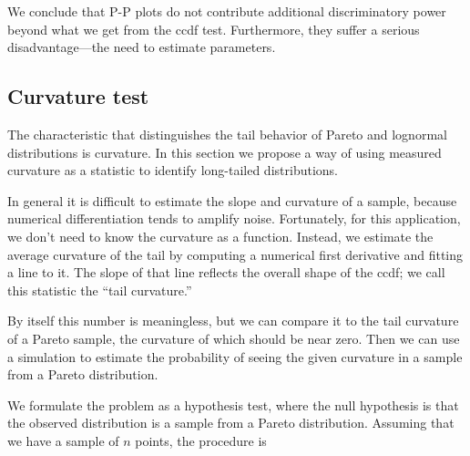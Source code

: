 \documentclass{elsart}
\begin{document}

We conclude that P-P plots do not contribute additional discriminatory
power beyond what we get from the ccdf test.  Furthermore, they
suffer a serious disadvantage---the need to estimate parameters.


\subsection {Curvature test}

The characteristic that distinguishes the tail behavior of Pareto
and lognormal distributions is curvature.  In this section we propose
a way of using measured curvature as a statistic to identify
long-tailed distributions.

In general it is difficult to estimate the slope and curvature of a
sample, because numerical differentiation tends to amplify noise.
Fortunately, for this application, we don't need to know the curvature
as a function.  Instead, we estimate the average curvature of the tail
by computing a numerical first derivative and fitting a line to it.
The slope of that line reflects the overall shape of the ccdf; we call
this statistic the ``tail curvature.''

By itself this number is meaningless, but we can compare it to the tail
curvature of a Pareto sample, the curvature of which should be near
zero.  Then we can use a simulation to estimate the probability
of seeing the given curvature in a sample from a Pareto distribution.

We formulate the problem as a hypothesis test, where the null
hypothesis is that the observed distribution is a sample from a Pareto
distribution.  Assuming that we have a sample of $n$ points, the
procedure is
\end{document}
